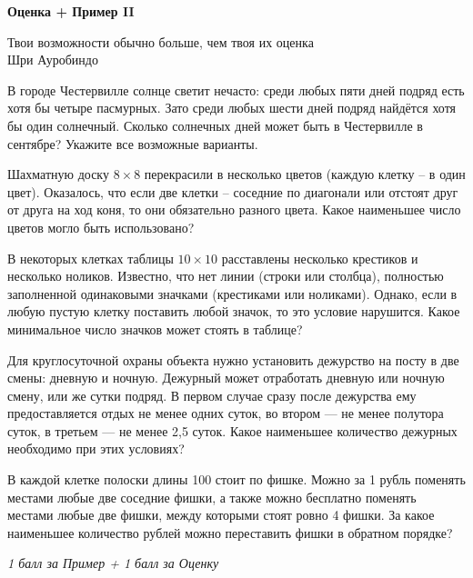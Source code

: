 \centerline{\bf \Huge Оценка + Пример II}

\begin{flushright}
        \scriptsize{Твои возможности обычно больше, чем твоя их оценка\\ Шри Ауробиндо}
\end{flushright}


 В городе Честервилле солнце светит нечасто: среди любых пяти дней подряд есть хотя бы четыре пасмурных. Зато среди любых шести дней подряд найдётся хотя бы один солнечный. Сколько солнечных дней может быть в Честервилле в сентябре? Укажите все возможные варианты.

 Шахматную доску $8\times8$ перекрасили в несколько цветов (каждую клетку – в один цвет). Оказалось, что если две клетки – соседние по диагонали или отстоят друг от друга на ход коня, то они обязательно разного цвета. Какое наименьшее число цветов могло быть использовано?

 В некоторых клетках таблицы $10\times10$ расставлены несколько крестиков и несколько ноликов. Известно, что нет линии (строки или столбца), полностью заполненной одинаковыми значками (крестиками или ноликами). Однако, если в любую пустую клетку поставить любой значок, то это условие нарушится. Какое минимальное число значков может стоять в таблице?

 Для круглосуточной охраны объекта нужно установить дежурство на посту в две смены: дневную и ночную. Дежурный может отработать дневную или ночную смену, или же сутки подряд. В первом случае сразу после дежурства ему предоставляется отдых не менее одних суток, во втором — не менее полутора суток, в третьем — не менее 2,5 суток. Какое наименьшее количество дежурных необходимо при этих условиях?


 В каждой клетке полоски длины 100 стоит по фишке. Можно за 1 рубль поменять местами любые две соседние фишки, а также можно бесплатно поменять местами любые две фишки, между которыми стоят ровно 4 фишки. За какое наименьшее количество рублей можно переставить фишки в обратном порядке?\\


\centerline{\textit{1 балл за Пример + 1 балл за Оценку}}\\